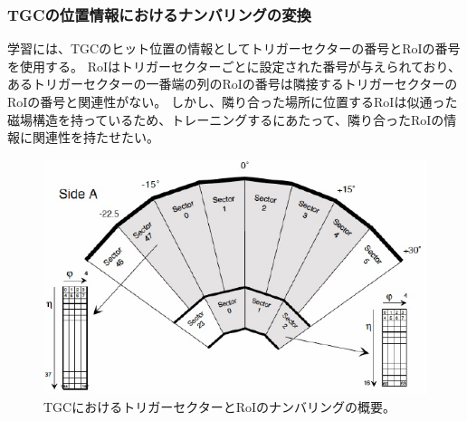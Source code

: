 
\subsubsection{TGCの位置情報におけるナンバリングの変換}
学習には、TGCのヒット位置の情報としてトリガーセクターの番号とRoIの番号を使用する。
RoIはトリガーセクターごとに設定された番号が与えられており、あるトリガーセクターの一番端の列のRoIの番号は隣接するトリガーセクターのRoIの番号と関連性がない。
しかし、隣り合った場所に位置するRoIは似通った磁場構造を持っているため、トレーニングするにあたって、隣り合ったRoIの情報に関連性を持たせたい。

\begin{figure}[tb]
  \centering
  \includegraphics[clip, width=12cm]{fig/4/TGC_numbering.pdf}
  \caption{TGCにおけるトリガーセクターとRoIのナンバリングの概要。}
  \label{fig:newnumbering}
\end{figure}

